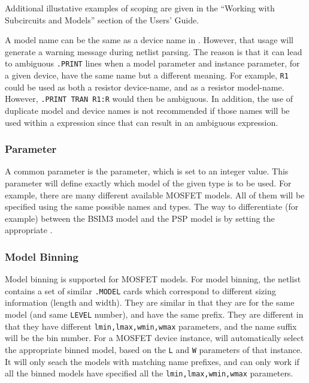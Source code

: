 \begin{Command}
Additional illustative examples of scoping are given in the
``Working with Subcircuits and Models'' section of the \Xyce{} Users' 
Guide\UsersGuide. 

A model name can be the same as a device name in \Xyce{}.  However, that
usage will generate a warning message during netlist parsing.  
The reason is that it can lead to ambiguous \texttt{.PRINT} lines 
when a model parameter and instance parameter, for a given device, have
the same name but a different meaning.  For example, \texttt{R1} 
could be used as both a resistor device-name, and as a resistor model-name.
However, \texttt{.PRINT TRAN R1:R} would then be ambiguous.  In addition,
the use of duplicate model and device names is not recommended if those
names will be used within a \Xyce{} expression since that can result in 
an ambiguous expression.

\end{Command}

\subsubsection{ Parameter}

A common parameter is the  parameter, which is set to an
integer value.  This parameter will define exactly which model of the
given type is to be used.  For example, there are many different
available MOSFET models.  All of them will be specified using the same
possible names and types.  The way to differentiate (for example)
between the BSIM3 model and the PSP model is by setting the appropriate
.

\subsubsection{Model Binning}

Model binning is supported for MOSFET models.  For model binning, the netlist 
contains a set of similar \texttt{.MODEL} cards which correspond to different 
sizing information (length and width).  They are similar in that they are for the same
model (and same \texttt{LEVEL} number), and have the same prefix.  They are different in that 
they have different \texttt{lmin,lmax,wmin,wmax} parameters, and the name suffix will be
the bin number.  For a MOSFET device instance, \Xyce{} will automatically select the
appropriate binned model, based on the \texttt{L} and \texttt{W} parameters of that 
instance.   It will only seach the models with matching name prefixes, and can only work if
all the binned models have specified all the \texttt{lmin,lmax,wmin,wmax} parameters.

